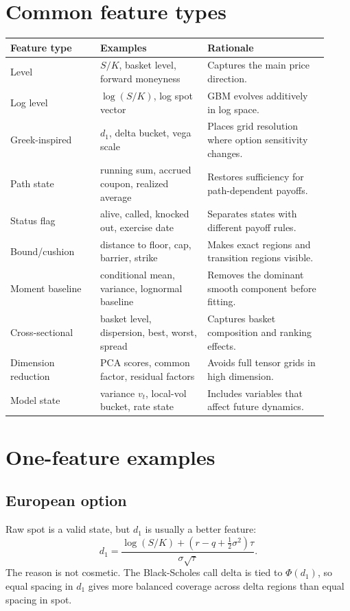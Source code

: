 \documentclass[11pt,oneside]{book}
\theoremstyle{definition}
\begin{document}
\section{Common feature types}
\begin{longtable}{@{}>{\raggedright\arraybackslash}p{0.26\linewidth}>{\raggedright\arraybackslash}p{0.31\linewidth}>{\raggedright\arraybackslash}p{0.35\linewidth}@{}}
\toprule
Feature type & Examples & Rationale\\
\midrule
Level & \(S/K\), basket level, forward moneyness & Captures the main price direction.\\
Log level & \(\log(S/K)\), log spot vector & GBM evolves additively in log space.\\
Greek-inspired & \(d_1\), delta bucket, vega scale & Places grid resolution where option sensitivity changes.\\
Path state & running sum, accrued coupon, realized average & Restores sufficiency for path-dependent payoffs.\\
Status flag & alive, called, knocked out, exercise date & Separates states with different payoff rules.\\
Bound/cushion & distance to floor, cap, barrier, strike & Makes exact regions and transition regions visible.\\
Moment baseline & conditional mean, variance, lognormal baseline & Removes the dominant smooth component before fitting.\\
Cross-sectional & basket level, dispersion, best, worst, spread & Captures basket composition and ranking effects.\\
Dimension reduction & PCA scores, common factor, residual factors & Avoids full tensor grids in high dimension.\\
Model state & variance \(v_t\), local-vol bucket, rate state & Includes variables that affect future dynamics.\\
\bottomrule
\end{longtable}

\section{One-feature examples}
\subsection{European option}
Raw spot is a valid state, but \(d_1\) is usually a better feature:
\[
  d_1=
  \frac{\log(S/K)+(r-q+\tfrac12\sigma^2)\tau}{\sigma\sqrt{\tau}}.
\]
The reason is not cosmetic. The Black-Scholes call delta is tied to
\(\Phi(d_1)\), so equal spacing in \(d_1\) gives more balanced coverage across
delta regions than equal spacing in spot.
\end{document}
